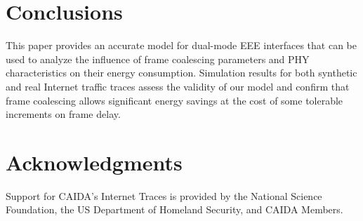 \documentclass[journal,10pt,letterpaper]{IEEEtran}
\begin{document}
\section{Conclusions}
\label{sec:conclusions}

This paper provides an accurate model for dual-mode EEE interfaces
that can be used to analyze the influence of frame coalescing
parameters and PHY characteristics on their energy
consumption. Simulation results for both synthetic and real Internet
traffic traces assess the validity of our model and confirm that frame
coalescing allows significant energy savings at the cost of some
tolerable increments on frame delay.

\section*{Acknowledgments}

Support for CAIDA's Internet Traces is provided by the National
Science Foundation, the US Department of Homeland Security, and CAIDA
Members.  





\end{document}
